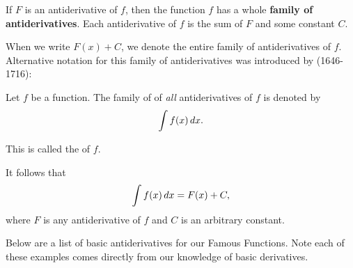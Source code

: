 \documentclass{ximera}
\begin{document}
\begin{theorem}\label{theorem:FOA}
	
	If $F$ is an antiderivative of $f$, then the function $f$ has a whole \textbf{family of antiderivatives}. 
	Each antiderivative of $f$ is the sum of $F$ and some constant $C$.
\end{theorem}

When we write $F(x)+C$, we denote the entire family of antiderivatives of $f$.  Alternative notation for this family of
antiderivatives was introduced by  (1646-1716):
 
\begin{definition}
	Let $f$ be a function. The family of of \emph{all} antiderivatives of $f$ is denoted by
	\[ \int f(x) \,d x.  \]

	This is called the  of $f$.
\end{definition}

It follows that
\[\int f(x) \,d x =F(x)+C, \]
where $F$ is any antiderivative of $f$ and $C$ is an arbitrary constant.


Below are a list of basic antiderivatives for our Famous Functions. 
Note each of these examples comes directly from our knowledge of basic derivatives.
\end{document}
